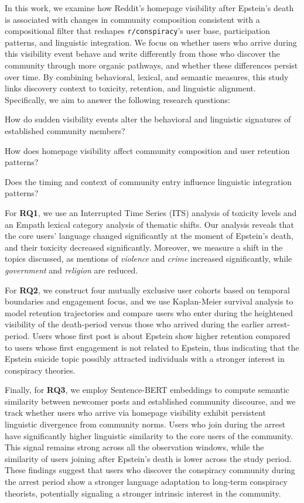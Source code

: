 \documentclass[letterpaper]{article} %
\begin{document}
In this work, we examine how Reddit's homepage visibility after Epstein's death is associated with changes in community composition consistent with a compositional filter that reshapes \texttt{r/conspiracy}'s user base, participation patterns, and linguistic integration. 
We focus on whether users who arrive during this visibility event behave and write differently from those who discover the community through more organic pathways, and whether these differences persist over time. 
By combining behavioral, lexical, and semantic measures, this study links discovery context to toxicity, retention, and linguistic alignment.
Specifically, we aim to answer the following research questions:

\begin{squishlist}
\item[\textbf{RQ1:}] How do sudden visibility events alter the behavioral and linguistic signatures of established community members?
\item[\textbf{RQ2:}] How does homepage visibility affect community composition and user retention patterns?
\item[\textbf{RQ3:}]Does the timing and context of community entry influence linguistic integration patterns?
\end{squishlist}

For \textbf{RQ1}, we use an Interrupted Time Series (ITS) analysis of toxicity levels and an Empath lexical category analysis of thematic shifts. 
Our analysis reveals that the core users' language changed significantly at the moment of Epstein's death, and their toxicity decreased significantly.
Moreover, we measure a shift in the topics discussed, as mentions of \textit{violence} and \textit{crime} increased significantly, while \textit{government} and \textit{religion} are reduced.  

For \textbf{RQ2}, we construct four mutually exclusive user cohorts based on temporal boundaries and engagement focus, and we use Kaplan-Meier survival analysis to model retention trajectories and compare users who enter during the heightened visibility of the death-period versus those who arrived during the earlier arrest-period.
Users whose first post is about Epstein show higher retention compared to users whose first engagement is not related to Epstein, thus indicating that the Epstein suicide topic possibly attracted individuals with a stronger interest in conspiracy theories.

Finally, for \textbf{RQ3}, we employ Sentence-BERT embeddings to compute semantic similarity between newcomer posts and established community discourse, and we track whether users who arrive via homepage visibility exhibit persistent linguistic divergence from community norms. 
Users who join during the arrest have significantly higher linguistic similarity to the core users of the community. 
This signal remains strong across all the observation windows, while the similarity of users joining after Epstein's death is lower across the study period.
These findings suggest that users who discover the conspiracy community during the arrest period show a stronger language adaptation to long-term conspiracy theorists, potentially signaling a stronger intrinsic interest in the community.
\end{document}
